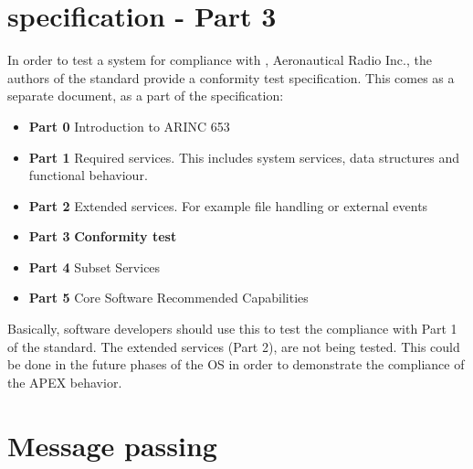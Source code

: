 \section{\arinc{} specification - Part 3}
In order to test a system for compliance with \arinc{}, Aeronautical
Radio Inc., the authors of the standard provide a conformity test
specification. This comes as a separate document, as a part of the
\arinc{} specification:
\begin{itemize}
	\item\textbf{Part 0} Introduction to ARINC 653
	\item\textbf{Part 1} Required services. This includes system services,
	data structures and functional behaviour.
	\item\textbf{Part 2} Extended services. For example file handling or external events
	\item\textbf{Part 3} \textbf{Conformity test}
	\item\textbf{Part 4} Subset Services
	\item\textbf{Part 5} Core Software Recommended Capabilities
\end{itemize}

Basically, software developers should use this to test the compliance with
Part 1 of the standard. The extended services (Part 2), are not being
tested. This could be done in the future phases of the \OSname{} OS in order
to demonstrate the compliance of the APEX behavior. 

\section{Message passing}
